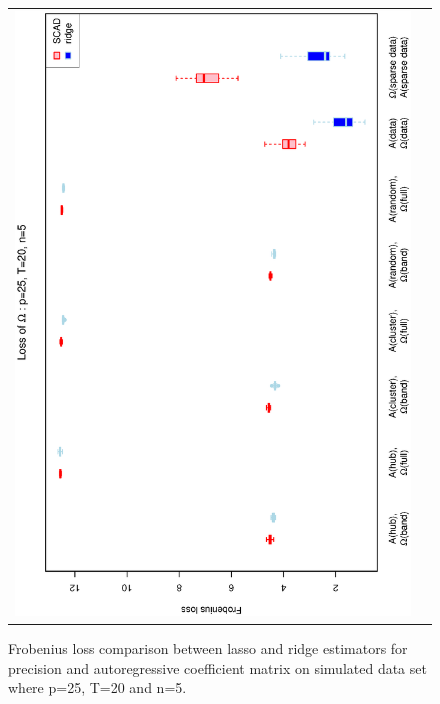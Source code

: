 \documentclass[a4paper]{article}
\begin{document}
\begin{figure}[h!]
\begin{tabular}{cc}
\includegraphics[scale=0.5,angle=270]{LossOmega25T20N5.eps}\\
\end{tabular}
\caption{Frobenius loss comparison between lasso and ridge estimators for precision and autoregressive coefficient matrix on simulated data set where p=25, T=20 and n=5.}
\label{fig:Loss25T20N5}
\end{figure}
\end{document}
